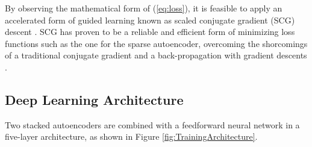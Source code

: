 By observing the mathematical form of (\ref{eq:loss}), it is feasible to apply
an accelerated form of guided learning known as scaled conjugate gradient (SCG)
descent \cite{moller1993scaled}. SCG has proven to be a reliable and efficient
form of minimizing loss functions such as the one for the sparse autoencoder,
overcoming the shorcomings of a traditional conjugate gradient and
a back-propagation with gradient descents \cite{le2013building}. 


\subsection{Deep Learning Architecture}

Two stacked autoencoders are combined with a feedforward neural network in a
five-layer architecture, as shown in Figure \ref{fig:TrainingArchitecture}. 
